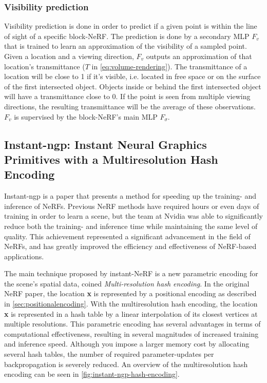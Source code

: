 

\subsubsection{Visibility prediction}
Visibility prediction is done in order to predict if a given point is within the line of sight of a specific block-NeRF. The prediction is done by a secondary MLP $F_v$ that is trained to learn an approximation of the visibility of a sampled point. Given a location and a viewing direction, $F_v$ outputs an approximation of that location's transmittance ($T$ in \autoref{eq:volume-rendering}). The transmittance of a location will be close to 1 if it's visible, i.e. located in free space or on the surface of the first intersected object. Objects inside or behind the first intersected object will have a transmittance close to 0. If the point is seen from multiple viewing directions, the resulting transmittance will be the average of these observations. $F_v$ is supervised by the block-NeRF's main MLP $F_\sigma$.



\subsection{Instant-ngp: Instant Neural Graphics Primitives with a Multiresolution Hash Encoding} \label{sec:instant-ngp}
Instant-ngp \cite{muller_instant_2022} is a paper that presents a method for speeding up the training- and inference of NeRFs. Previous NeRF methods have required hours or even days of training in order to learn a scene, but the team at Nvidia was able to significantly reduce both the training- and inference time while maintaining the same level of quality. This achievement represented a significant advancement in the field of NeRFs, and has greatly improved the efficiency and effectiveness of NeRF-based applications.

The main technique proposed by instant-NeRF is a new parametric encoding for the scene's spatial data, coined \textit{Multi-resolution hash encoding}. In the original NeRF paper, the location \textbf{x} is represented by a positional encoding as described in \autoref{sec:positionalencoding}. With the multiresolution hash encoding, the location \textbf{x} is represented in a hash table by a linear interpolation of its closest vertices at multiple resolutions. This parametric encoding has several advantages in terms of computational effectiveness, resulting in several magnitudes of increased training and inference speed. Although you impose a larger memory cost by allocating several hash tables, the number of required parameter-updates per backpropagation is severely reduced. An overview of the multiresolution hash encoding can be seen in \autoref{fig:instant-ngp-hash-encoding}.

